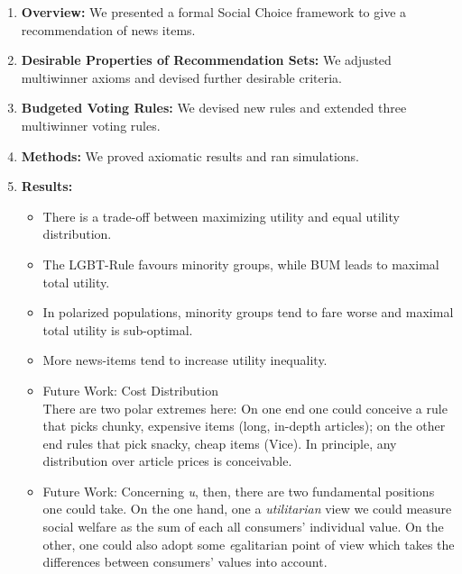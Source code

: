 \documentclass{article}
\begin{document}
\begin{enumerate}
	\item \textbf{Overview:} We presented a formal Social Choice framework to give a recommendation of news items.
	\item \textbf{Desirable Properties of Recommendation Sets:} We adjusted multiwinner axioms and devised further desirable criteria.
	\item \textbf{Budgeted Voting Rules:} We devised new rules and extended three multiwinner voting rules.
	\item \textbf{Methods:} We proved axiomatic results and ran simulations.
	\item \textbf{Results:}
\begin{itemize}
\item There is a trade-off between maximizing utility and equal utility distribution.
\item The LGBT-Rule favours minority groups, while BUM leads to maximal total utility.
\item In polarized populations, minority groups tend to fare worse and maximal total utility is sub-optimal.
\item More news-items tend to increase utility inequality.
\item Future Work: Cost Distribution\\
There are two polar extremes here:
On one end one could conceive a rule that picks chunky, expensive items (long, in-depth articles);
 on the other end rules that pick snacky, cheap items (Vice).
 In principle, any distribution over article prices is conceivable.
 \item Future Work: Concerning \emph {u}, then, there are two fundamental positions one could take. On the one hand, one a \emph {utilitarian} view we could measure social welfare as the sum of each all consumers' individual value. On the other, one could also adopt some {\emph egalitarian} point of view which takes the differences between consumers' values into account.
\end{itemize}
\end{enumerate}





\end{document}
